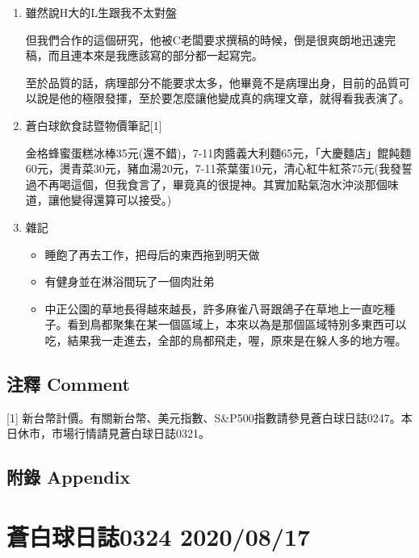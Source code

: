 \documentclass[
]{article}
\providecommand{\tightlist}{%
  \setlength{\itemsep}{0pt}\setlength{\parskip}{0pt}}
\begin{document}
\begin{enumerate}
\def\labelenumi{\arabic{enumi}.}
\item
  雖然說H大的L生跟我不太對盤

  但我們合作的這個研究，他被C老闆要求撰稿的時候，倒是很爽朗地迅速完稿，而且連本來是我應該寫的部分都一起寫完。

  至於品質的話，病理部分不能要求太多，他畢竟不是病理出身，目前的品質可以說是他的極限發揮，至於要怎麼讓他變成真的病理文章，就得看我表演了。
\item
  蒼白球飲食誌暨物價筆記{[}1{]}

  金格蜂蜜蛋糕冰棒35元(還不錯)，7-11肉醬義大利麵65元，「大慶麵店」餛飩麵60元，燙青菜30元，豬血湯20元，7-11茶葉蛋10元，清心紅牛紅茶75元(我發誓過不再喝這個，但我食言了，畢竟真的很提神。其實加點氣泡水沖淡那個味道，讓他變得還算可以接受。)
\item
  雜記

  \begin{itemize}
  \tightlist
  \item
    睡飽了再去工作，把母后的東西拖到明天做
  \item
    有健身並在淋浴間玩了一個肉壯弟
  \item
    中正公園的草地長得越來越長，許多麻雀八哥跟鴿子在草地上一直吃種子。看到鳥都聚集在某一個區域上，本來以為是那個區域特別多東西可以吃，結果我一走進去，全部的鳥都飛走，喔，原來是在躲人多的地方喔。
  \end{itemize}
\end{enumerate}

\hypertarget{ux6ce8ux91cb-comment-15}{%
\subsection{注釋 Comment}\label{ux6ce8ux91cb-comment-15}}

{[}1{]}
新台幣計價。有關新台幣、美元指數、S\&P500指數請參見蒼白球日誌0247。本日休市，市場行情請見蒼白球日誌0321。

\hypertarget{ux9644ux9304-appendix-15}{%
\subsection{附錄 Appendix}\label{ux9644ux9304-appendix-15}}

\hypertarget{ux84bcux767dux7403ux65e5ux8a8c0324-20200817}{%
\section{蒼白球日誌0324
2020/08/17}\label{ux84bcux767dux7403ux65e5ux8a8c0324-20200817}}
\end{document}

